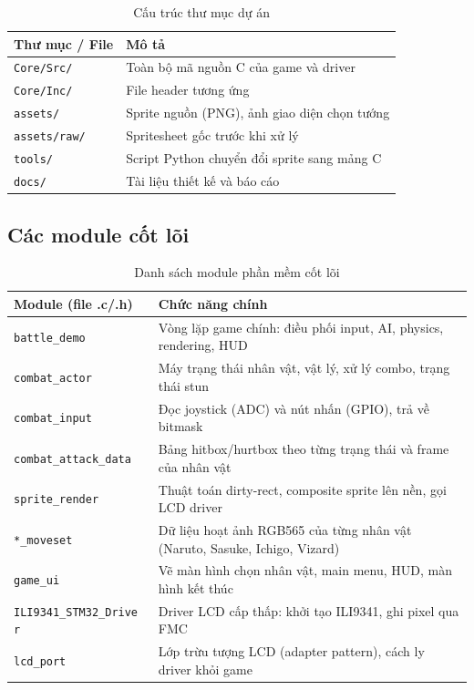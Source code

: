 \documentclass[a4paper,12pt]{report}
\begin{document}
\begin{table}[H]
\centering
\caption{Cấu trúc thư mục dự án}
\begin{tabular}{p{4.5cm} p{9cm}}
\toprule
\textbf{Thư mục / File} & \textbf{Mô tả} \\
\midrule
\texttt{Core/Src/} & Toàn bộ mã nguồn C của game và driver \\
\texttt{Core/Inc/} & File header tương ứng \\
\texttt{assets/} & Sprite nguồn (PNG), ảnh giao diện chọn tướng \\
\texttt{assets/raw/} & Spritesheet gốc trước khi xử lý \\
\texttt{tools/} & Script Python chuyển đổi sprite sang mảng C \\
\texttt{docs/} & Tài liệu thiết kế và báo cáo \\
\bottomrule
\end{tabular}
\end{table}

\subsection{Các module cốt lõi}

\begin{table}[H]
\centering
\caption{Danh sách module phần mềm cốt lõi}
\begin{tabular}{p{4.5cm} p{9cm}}
\toprule
\textbf{Module (file .c/.h)} & \textbf{Chức năng chính} \\
\midrule
\texttt{battle\_demo} & Vòng lặp game chính: điều phối input, AI, physics, rendering, HUD \\
\texttt{combat\_actor} & Máy trạng thái nhân vật, vật lý, xử lý combo, trạng thái stun \\
\texttt{combat\_input} & Đọc joystick (ADC) và nút nhấn (GPIO), trả về bitmask \\
\texttt{combat\_attack\_data} & Bảng hitbox/hurtbox theo từng trạng thái và frame của nhân vật \\
\texttt{sprite\_render} & Thuật toán dirty-rect, composite sprite lên nền, gọi LCD driver \\
\texttt{*\_moveset} & Dữ liệu hoạt ảnh RGB565 của từng nhân vật (Naruto, Sasuke, Ichigo, Vizard) \\
\texttt{game\_ui} & Vẽ màn hình chọn nhân vật, main menu, HUD, màn hình kết thúc \\
\texttt{ILI9341\_STM32\_Drive
r} & Driver LCD cấp thấp: khởi tạo ILI9341, ghi pixel qua FMC \\
\texttt{lcd\_port} & Lớp trừu tượng LCD (adapter pattern), cách ly driver khỏi game \\
\bottomrule
\end{tabular}
\end{table}
\end{document}
